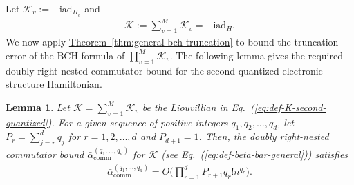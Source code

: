 \documentclass[aps,pra,reprint,groupedaddress,floatfix]{revtex4-2}
\newtheorem{lemma}{Lemma}
\newcommand{\eq}[1]{(\ref{eq:#1})}
\newcommand{\thm}[1]{\hyperref[thm:#1]{Theorem~\ref*{thm:#1}}}
\renewcommand{\i}{\mathrm{i}}
\newcommand{\ad}{\mathrm{ad}}
\renewcommand{\comm}{\mathrm{comm}}
\newcommand{\mc}{\mathcal}
\begin{document}
Let $\mc{K}_v:=-\i \ad_{H_v}$ and \begin{align}
\label{eq:def-K-second-quantized}
    \mc{K}:= \sum_{v=1}^M  \mc K_v= -\i \ad_H. 
\end{align}
We now apply \thm{general-bch-truncation} to bound the truncation error of the BCH formula of $\prod_{v=1}^M\mc K_v$. The following lemma gives the required doubly right-nested commutator bound for the second-quantized electronic-structure Hamiltonian.
\begin{lemma}
    Let $\mc K = \sum_{v=1}^M \mc K_v$ be the Liouvillian in Eq.~\eq{def-K-second-quantized}. For a given sequence of positive integers $q_1, q_2, \ldots, q_d$, let $P_{r} = \sum_{j=r}^{d} q_j$ for $r=1, 2, \ldots, d$ and $P_{d+1}=1$. Then, the doubly right-nested commutator bound $\bar{\alpha}_{\comm}^{(q_1, \ldots, q_{d})}$ for $\mc K$ (see Eq.~\eq{def-beta-bar-general}) satisfies
    \begin{align}
    \label{eq:double-comm-second-quantized}
        \bar{\alpha}_{\comm}^{(q_1, \ldots, q_{d})}= O\bigg(\prod_{r=1}^{d}P_{r+1} q_r!n^{q_r}\bigg).
    \end{align}
\end{lemma}
\end{document}
